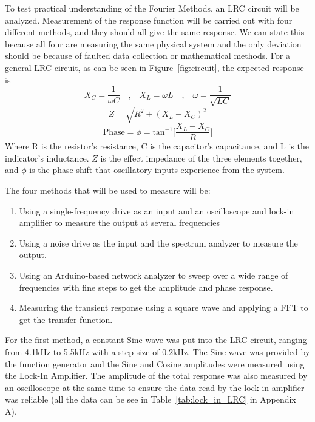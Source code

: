 \documentclass[12pt]{article}
\begin{document}
    To test practical understanding of the Fourier Methods, an LRC circuit will be analyzed. Measurement of the response function will be carried out with four different methods, and they should all give the same response. We can state this because all four are measuring the same physical system and the only deviation should be because of faulted data collection or mathematical methods. For a general LRC circuit, as can be seen in Figure~\ref{fig:circuit}, the expected response is
    \begin{equation*}
        X_C = \frac{1}{\omega C}\quad \text{,} \quad X_L = \omega L \quad \text{,} \quad \omega = \frac{1}{\sqrt{LC}}
    \end{equation*}
    \begin{equation}
        Z = \sqrt{R^2 + (X_L - X_C)^2}
    \end{equation}
    \begin{equation}
        \text{Phase} = \phi = \text{tan}^{-1}\Big[\frac{X_L-X_C}{R}\Big]
    \end{equation}
    Where R is the resistor's resistance, C is the capacitor's capacitance, and L is the indicator's inductance. $Z$ is the effect impedance of the three elements together, and $\phi$ is the phase shift that oscillatory inputs experience from the system. 
    
    The four methods that will be used to measure will be: 
    \begin{enumerate}
        \item Using a single-frequency drive as an input and an oscilloscope and lock-in amplifier to measure the output at several frequencies
        \item Using a noise drive as the input and the spectrum analyzer to measure the output.
        \item Using an Arduino-based network analyzer to sweep over a wide range of frequencies with fine steps to get the amplitude and phase response.
        \item Measuring the transient response using a square wave and applying a FFT to get the transfer function.
    \end{enumerate}
    
    For the first method, a constant Sine wave was put into the LRC circuit, ranging from 4.1kHz to 5.5kHz with a step size of 0.2kHz. The Sine wave was provided by the function generator and the Sine and Cosine amplitudes were measured using the Lock-In Amplifier. The amplitude of the total response was also measured by an oscilloscope at the same time to ensure the data read by the lock-in amplifier was reliable (all the data can be see in Table~\ref{tab:lock_in_LRC} in Appendix A). 
    
\end{document}
